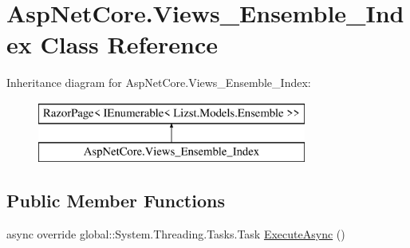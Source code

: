 \hypertarget{class_asp_net_core_1_1_views___ensemble___index}{}\section{Asp\+Net\+Core.\+Views\+\_\+\+Ensemble\+\_\+\+Index Class Reference}
\label{class_asp_net_core_1_1_views___ensemble___index}
Inheritance diagram for Asp\+Net\+Core.\+Views\+\_\+\+Ensemble\+\_\+\+Index\+:\begin{figure}[H]
\begin{center}
\leavevmode
\includegraphics[height=2.000000cm]{class_asp_net_core_1_1_views___ensemble___index}
\end{center}
\end{figure}
\subsection*{Public Member Functions}
\begin{DoxyCompactItemize}
\item 
async override global\+::\+System.\+Threading.\+Tasks.\+Task \mbox{\hyperlink{class_asp_net_core_1_1_views___ensemble___index_a724d17e6d781c9b2473e5b7748456618}{Execute\+Async}} ()
\end{DoxyCompactItemize}
